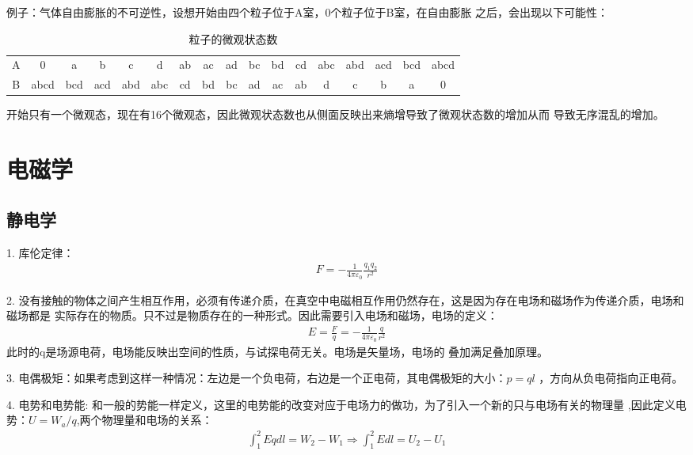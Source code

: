 \documentclass[UTF8]{article}
\numberwithin{equation}{section}
\begin{document}
例子：气体自由膨胀的不可逆性，设想开始由四个粒子位于A室，0个粒子位于B室，在自由膨胀
之后，会出现以下可能性：
\begin{center}
    \begin{table}[htbp]
        \centering
        \caption{粒子的微观状态数}
        \begin{tabular}{ccccccccccccccccc}
            \toprule  %
            A&0&a&b&c&d&ab&
            ac&ad&bc&bd&cd&abc&abd&acd&bcd&abcd \\ 
            \cmidrule{1-17}
            B&abcd&bcd&acd&abd&abc&cd&bd&bc&ad&ac&ab&d&c&b&a&0 \\
            \bottomrule  %
        \end{tabular}
\end{table}  
\end{center}

开始只有一个微观态，现在有16个微观态，因此微观状态数也从侧面反映出来熵增导致了微观状态数的增加从而
导致无序混乱的增加。
\newpage
\section{电磁学}
\subsection{静电学}
1. 库伦定律：
\begin{align*}
    F=-\frac{1}{4\pi \varepsilon_0}\frac{q_1q_2}{r^2}
\end{align*}

2. 没有接触的物体之间产生相互作用，必须有传递介质，在真空中电磁相互作用仍然存在，这是因为存在电场和磁场作为传递介质，电场和磁场都是
实际存在的物质。只不过是物质存在的一种形式。因此需要引入电场和磁场，电场的定义：
\begin{align*}
    E=\frac{F}{q}=-\frac{1}{4\pi\varepsilon_0}\frac{q}{r^2}
\end{align*}
此时的q是场源电荷，电场能反映出空间的性质，与试探电荷无关。电场是矢量场，电场的
叠加满足叠加原理。

3. 电偶极矩：如果考虑到这样一种情况：左边是一个负电荷，右边是一个正电荷，其电偶极矩的大小：$p=ql$
，方向从负电荷指向正电荷。

4. 电势和电势能:
和一般的势能一样定义，这里的电势能的改变对应于电场力的做功，为了引入一个新的只与电场有关的物理量
,因此定义电势：$U=W_a/q$,两个物理量和电场的关系：
\begin{align*}
    \int _1^2 Eqdl = W_2-W_1\Rightarrow \int_1^2 Edl = U_2-U_1
\end{align*}
\end{document}
